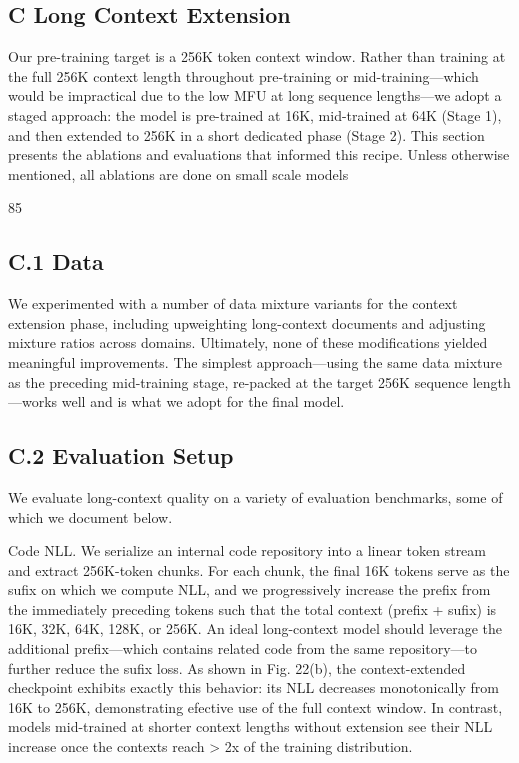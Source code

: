 \documentclass[
  10
]{article}
\newcounter{none} %
\begin{document}
\subsection{C Long Context Extension}\label{c-long-context-extension}

Our pre-training target is a 256K token context window. Rather than
training at the full 256K context length throughout pre-training or
mid-training---which would be impractical due to the low MFU at long
sequence lengths---we adopt a staged approach: the model is pre-trained
at 16K, mid-trained at 64K (Stage 1), and then extended to 256K in a
short dedicated phase (Stage 2). This section presents the ablations and
evaluations that informed this recipe. Unless otherwise mentioned, all
ablations are done on small scale models

85

\subsection{C.1 Data}\label{c.1-data}

We experimented with a number of data mixture variants for the context
extension phase, including upweighting long-context documents and
adjusting mixture ratios across domains. Ultimately, none of these
modifications yielded meaningful improvements. The simplest
approach---using the same data mixture as the preceding mid-training
stage, re-packed at the target 256K sequence length---works well and is
what we adopt for the final model.

\subsection{C.2 Evaluation Setup}\label{c.2-evaluation-setup}

We evaluate long-context quality on a variety of evaluation benchmarks,
some of which we document below.

Code NLL. We serialize an internal code repository into a linear token
stream and extract 256K-token chunks. For each chunk, the final 16K
tokens serve as the sufix on which we compute NLL, and we progressively
increase the prefix from the immediately preceding tokens such that the
total context (prefix + sufix) is 16K, 32K, 64K, 128K, or 256K. An ideal
long-context model should leverage the additional prefix---which
contains related code from the same repository---to further reduce the
sufix loss. As shown in Fig. 22(b), the context-extended checkpoint
exhibits exactly this behavior: its NLL decreases monotonically from 16K
to 256K, demonstrating efective use of the full context window. In
contrast, models mid-trained at shorter context lengths without
extension see their NLL increase once the contexts reach \textgreater{}
2x of the training distribution.
\end{document}
